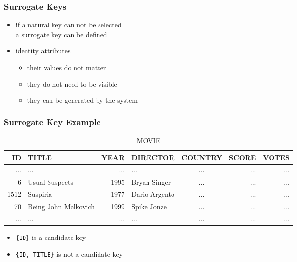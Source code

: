\documentclass[dvipsnames]{beamer}
\theoremstyle{plain}
\begin{document}
\begin{frame}
  \frametitle{Surrogate Keys}

  \begin{itemize}
    \item if a \alert{natural key} can not be selected\\
      a \alert{surrogate key} can be defined

    \pause
    \medskip
    \item identity attributes
    \begin{itemize}
      \item their values do not matter
      \item they do not need to be visible
      \item they can be generated by the system
    \end{itemize}
  \end{itemize}
\end{frame}

\begin{frame}
  \frametitle{Surrogate Key Example}

  \begin{example}
    \begin{tiny}
    \begin{table}
      \caption{MOVIE}
      \begin{tabular}{|r|l|r|l|c|r|r|}\hline
  ID & TITLE                & YEAR & DIRECTOR      & COUNTRY & SCORE & VOTES\\\hline\hline
 ... & ...                  &  ... & ...           & ...     & ...   &   ...\\\hline
   6 & Usual Suspects       & 1995 & Bryan Singer  & ...     & ...   &   ...\\\hline
1512 & Suspiria             & 1977 & Dario Argento & ...     & ...   &   ...\\\hline
  70 & Being John Malkovich & 1999 & Spike Jonze   & ...     & ...   &   ...\\\hline
 ... & ...                  &  ... & ...           & ...     & ...   &   ...\\\hline
      \end{tabular}
    \end{table}
    \end{tiny}

    \pause
    \begin{itemize}
      \item \texttt{\{ID\}} is a candidate key
      \item \texttt{\{ID, TITLE\}} is not a candidate key
    \end{itemize}
  \end{example}
\end{frame}
\end{document}
